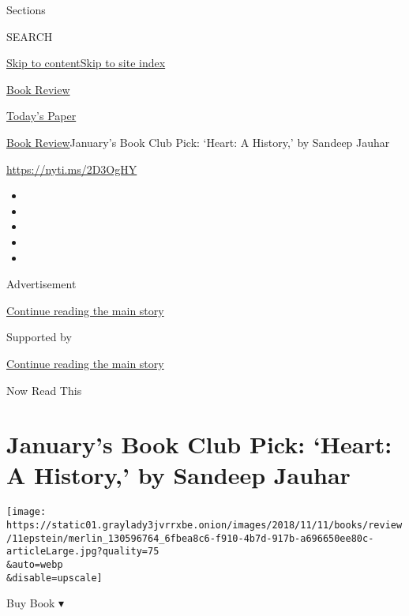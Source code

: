 Sections

SEARCH

\protect\hyperlink{site-content}{Skip to
content}\protect\hyperlink{site-index}{Skip to site index}

\href{https://www.nytimes3xbfgragh.onion/section/books/review}{Book
Review}

\href{https://myaccount.nytimes3xbfgragh.onion/auth/login?response_type=cookie\&client_id=vi}{}

\href{https://www.nytimes3xbfgragh.onion/section/todayspaper}{Today's
Paper}

\href{/section/books/review}{Book Review}\textbar{}January's Book Club
Pick: `Heart: A History,' by Sandeep Jauhar

\url{https://nyti.ms/2D3OgHY}

\begin{itemize}
\item
\item
\item
\item
\item
\end{itemize}

Advertisement

\protect\hyperlink{after-top}{Continue reading the main story}

Supported by

\protect\hyperlink{after-sponsor}{Continue reading the main story}

Now Read This

\hypertarget{januarys-book-club-pick-heart-a-history-by-sandeep-jauhar}{%
\section{January's Book Club Pick: `Heart: A History,' by Sandeep
Jauhar}\label{januarys-book-club-pick-heart-a-history-by-sandeep-jauhar}}

\texttt{[image: https://static01.graylady3jvrrxbe.onion/images/2018/11/11/books/review/11epstein/merlin\_130596764\_6fbea8c6-f910-4b7d-917b-a696650ee80c-articleLarge.jpg?quality=75\\\&auto=webp\\\&disable=upscale]}

Buy Book ▾

